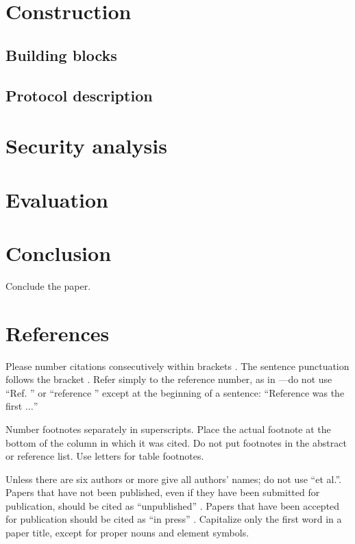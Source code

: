 \documentclass[conference]{IEEEtran}
\begin{document}
\section{Construction}

\subsection{Building blocks}

\subsection{Protocol description}

\section{Security analysis}

\section{Evaluation}

\section{Conclusion}
Conclude the paper.

\section*{References}

Please number citations consecutively within brackets \cite{b1}. The 
sentence punctuation follows the bracket \cite{b2}. Refer simply to the reference 
number, as in \cite{b3}---do not use ``Ref. \cite{b3}'' or ``reference \cite{b3}'' except at 
the beginning of a sentence: ``Reference \cite{b3} was the first $\ldots$''

Number footnotes separately in superscripts. Place the actual footnote at 
the bottom of the column in which it was cited. Do not put footnotes in the 
abstract or reference list. Use letters for table footnotes.

Unless there are six authors or more give all authors' names; do not use 
``et al.''. Papers that have not been published, even if they have been 
submitted for publication, should be cited as ``unpublished'' \cite{b4}. Papers 
that have been accepted for publication should be cited as ``in press'' \cite{b5}. 
Capitalize only the first word in a paper title, except for proper nouns and 
element symbols.
\end{document}
